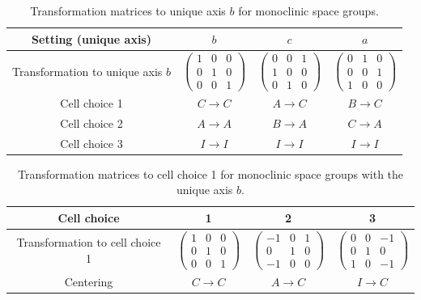 \begin{table}[htb]
  \centering
  \small
  \caption{Transformation matrices to unique axis $b$ for monoclinic space groups.}
  \label{tab:monoclinic-settings}
  \begin{tabular}{c|ccc}
    \hline\hline
    Setting (unique axis) & $b$ & $c$ & $a$ \\
    \hline
    Transformation to unique axis $b$ &
      $\begin{pmatrix} 1& 0&0 \\ 0& 1&0 \\ 0& 0&1 \end{pmatrix}$ &
      $\begin{pmatrix}0& 0&1 \\1& 0&0 \\0& 1&0\end{pmatrix}$ &
      $\begin{pmatrix} 0&1&0 \\ 0&0&1 \\ 1&0&0 \end{pmatrix}$ \\
    Cell choice 1 & $C \to C$ & $A \to C$ & $B \to C$ \\
    Cell choice 2 & $A \to A$ & $B \to A$ & $C \to A$ \\
    Cell choice 3 & $I \to I$ & $I \to I$ & $I \to I$ \\
    \hline\hline
  \end{tabular}
\end{table}

\begin{table}[htb]
  \centering
  \caption{Transformation matrices to cell choice 1 for monoclinic space groups with the unique axis $b$.}
  \label{tab:monoclinic-cell-choice}
  \begin{tabular}{c|ccc}
    \hline\hline
    Cell choice & 1 & 2 & 3 \\
    \hline
    Transformation to cell choice 1
      & $\begin{pmatrix} 1&0&0\\0&1&0\\0&0&1 \end{pmatrix}$
      & $\begin{pmatrix} -1&0&1\\0&1&0\\-1&0&0 \end{pmatrix}$
      & $\begin{pmatrix} 0&0&-1\\0&1&0\\1&0&-1 \end{pmatrix}$ \\
    Centering & $C \to C$ & $A \to C$ & $I \to C$ \\
    \hline\hline
  \end{tabular}
\end{table}

